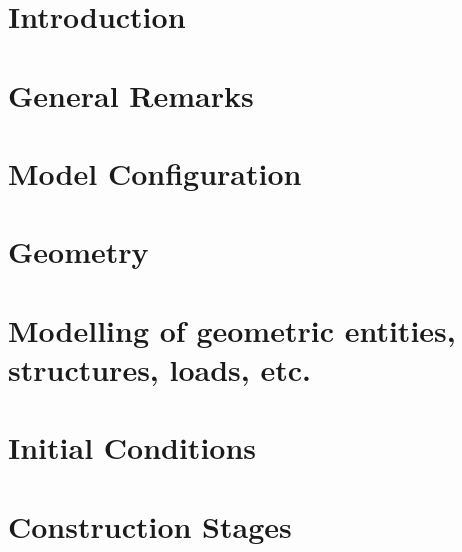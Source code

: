 \documentclass[12pt,a4paper]{report}
\title{\varTitle}
\author{\varAuthor}
\date{\varDate}
\begin{document}
\setlength{\aweboxcontentwidth}{0.81\linewidth}




\tableofcontents

\chapter{Introduction}
\label{chap:introduction}


\chapter{General Remarks}
\label{chap:general}


\chapter{Model Configuration}
\label{chap:setup}


\chapter{Geometry}
\label{chap:geometry}


\chapter{Modelling of geometric entities, structures, loads, etc.}
\label{chap:entities}


\chapter{Initial Conditions}
\label{chap:initial}


\chapter{Construction Stages}
\label{chap:stages}

\end{document}
